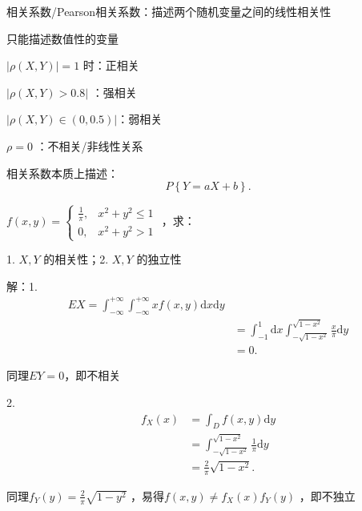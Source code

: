 \begin{notation}
    相关系数/Pearson相关系数：描述两个随机变量之间的线性相关性

    只能描述数值性的变量
\end{notation}
$|\rho\left( X,Y \right)|=1 $ 时：正相关

$\left| \rho\left( X,Y \right) >0.8 \right| $ ：强相关

$\left| \rho\left( X,Y \right) \in \left( 0,0.5 \right)  \right| $：弱相关

$\rho=0$ ：不相关/非线性关系
\begin{notation}
    相关系数本质上描述：
    \[
        P\left\{ Y=aX+b \right\} 
    .\] 
\end{notation}
\begin{eg}
    $f\left( x,y \right) =\begin{cases}
        \frac{1}{\pi} ,&x^2+y^2\le 1\\
        0,&x^2+y^2>1
    \end{cases}$ ，求：

    1. $X,Y$ 的相关性；2. $X,Y$ 的独立性
\end{eg}
解：1. 
\begin{align*}
    EX=\int_{-\infty}^{+\infty} \int_{-\infty}^{+\infty} xf\left( x,y \right)  \mathrm{d}x \mathrm{d}y\\
    &= \int_{-1}^{1}  \mathrm{d}x \int_{-\sqrt{1-x^2} }^{\sqrt{1-x^2} } \frac{x}{\pi}  \mathrm{d}y \\
    &= 0
.\end{align*}

同理$EY=0$，即不相关

2. 
\begin{align*}
    f_X\left( x \right) &= \int_{D}^{} f\left( x,y \right)  \mathrm{d}y \\
    &=\int_{-\sqrt{1-x^2} }^{\sqrt{1-x^2} } \frac{1}{\pi}  \mathrm{d}y\\
                        &=\frac{2}{\pi} \sqrt{1-x^2} 
.\end{align*}

同理$f_Y\left( y \right) =\displaystyle{\frac{2}{\pi} \sqrt{1-y^2}}$ ，易得$f\left( x,y \right) \neq f_X\left( x \right) f_Y\left( y \right) $ ，即不独立

{}

